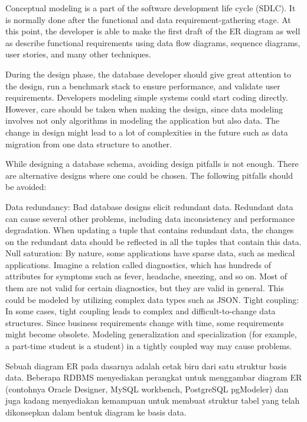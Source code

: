 \documentclass[]{book}
\begin{document}
Conceptual modeling is a part of the software development life cycle (SDLC). It is normally done after the functional and data requirement-gathering stage. At this point, the developer is able to make the first draft of the ER diagram as well as describe functional requirements using data flow diagrams, sequence diagrams, user stories, and many other techniques.

During the design phase, the database developer should give great attention to the design, run a benchmark stack to ensure performance, and validate user requirements. Developers modeling simple systems could start coding directly. However, care should be taken when making the design, since data modeling involves not only algorithms in modeling the application but also data. The change in design might lead to a lot of complexities in the future such as data migration from one data structure to another.

While designing a database schema, avoiding design pitfalls is not enough. There are alternative designs where one could be chosen. The following pitfalls should be avoided:

Data redundancy: Bad database designs elicit redundant data. Redundant data can cause several other problems, including data inconsistency and performance degradation. When updating a tuple that contains redundant data, the changes on the redundant data should be reflected in all the tuples that contain this data.
Null saturation: By nature, some applications have sparse data, such as medical applications. Imagine a relation called diagnostics, which has hundreds of attributes for symptoms such as fever, headache, sneezing, and so on. Most of them are not valid for certain diagnostics, but they are valid in general. This could be modeled by utilizing complex data types such as JSON.
Tight coupling: In some cases, tight coupling leads to complex and difficult-to-change data structures. Since business requirements change with time, some requirements might become obsolete. Modeling generalization and specialization (for example, a part-time student is a student) in a tightly coupled way may cause problems.

Sebuah diagram ER pada dasarnya adalah cetak biru dari satu struktur basis data. Beberapa RDBMS menyediakan perangkat untuk menggambar diagram ER (contohnya Oracle Designer, MySQL workbench, PostgreSQL pgModeler) dan juga kadang menyediakan kemampuan untuk membuat struktur tabel yang telah dikonsepkan dalam bentuk diagram ke basis data.
\end{document}
